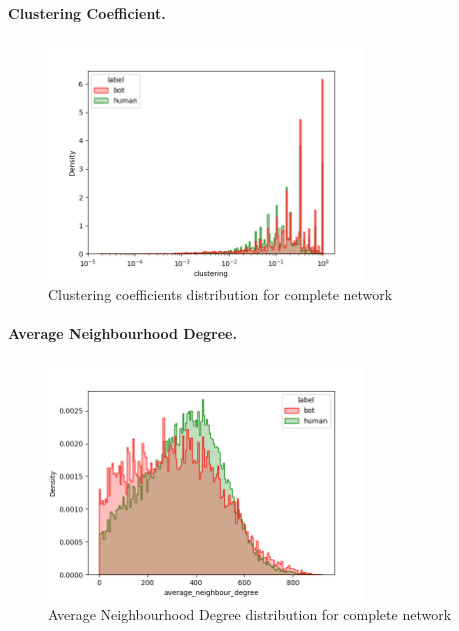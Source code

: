 \documentclass[12pt, a4paper]{article}
\begin{document}
		\paragraph{Clustering Coefficient.}
        \begin{figure}[H]
            \centering
            \includegraphics[width=0.75\textwidth]{complete_clustering.png}
            \caption{Clustering coefficients distribution for complete network}
        \end{figure}
		\paragraph{Average Neighbourhood Degree.}
		\begin{figure}[H]
			\centering
            \includegraphics[width=0.75\textwidth]{complete_average_neighbour_degree.png}
            \caption{Average Neighbourhood Degree distribution for complete network}
        \end{figure}
\end{document}
